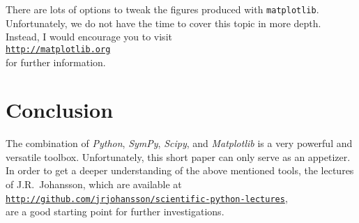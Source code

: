 \documentclass{report}
\begin{document}
There are lots of options to tweak the figures produced with \texttt{matplotlib}.  Unfortunately, we
do not have the time to cover this topic in more depth.  Instead, I would encourage you to visit
\\[0.2cm]
\hspace*{1.3cm}
\href{http://matplotlib.org}{\texttt{http://matplotlib.org}}
\\[0.2cm]
for further information.

\chapter{Conclusion}
The combination of \textsl{Python}, \textsl{SymPy}, \textsl{Scipy}, and \textsl{Matplotlib} is a
very powerful and versatile toolbox.  Unfortunately, this short paper can only serve as an appetizer.
In order to get a deeper understanding of the above mentioned tools, the lectures of J.R.~Johansson, which are
available at
\\[0.2cm]
\hspace*{1.3cm}
\href{http://github.com/jrjohansson/scientific-python-lectures}{\texttt{http://github.com/jrjohansson/scientific-python-lectures}},
\\[0.2cm]
are a good starting point for further investigations.
\end{document}

